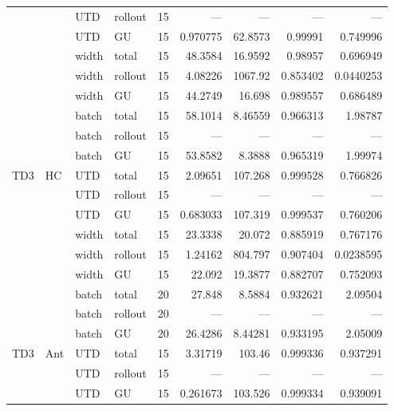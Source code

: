 {\begin{longtable}{@{}llllrrrrr@{}}
     &  & UTD & rollout & \num{15} & --- & --- & --- & --- \\
     &  & UTD & GU & \num{15} & \num{0.970775} & \num{62.8573} & \num{0.99991} & \num{0.749996} \\
     &  & width & total & \num{15} & \num{48.3584} & \num{16.9592} & \num{0.98957} & \num{0.696949} \\
     &  & width & rollout & \num{15} & \num{4.08226} & \num{1067.92} & \num{0.853402} & \num{0.0440253} \\
     &  & width & GU & \num{15} & \num{44.2749} & \num{16.698} & \num{0.989557} & \num{0.686489} \\
     &  & batch & total & \num{15} & \num{58.1014} & \num{8.46559} & \num{0.966313} & \num{1.98787} \\
     &  & batch & rollout & \num{15} & --- & --- & --- & --- \\
     &  & batch & GU & \num{15} & \num{53.8582} & \num{8.3888} & \num{0.965319} & \num{1.99974} \\
    \midrule
    TD3 & HC & UTD & total & \num{15} & \num{2.09651} & \num{107.268} & \num{0.999528} & \num{0.766826} \\
     &  & UTD & rollout & \num{15} & --- & --- & --- & --- \\
     &  & UTD & GU & \num{15} & \num{0.683033} & \num{107.319} & \num{0.999537} & \num{0.760206} \\
     &  & width & total & \num{15} & \num{23.3338} & \num{20.072} & \num{0.885919} & \num{0.767176} \\
     &  & width & rollout & \num{15} & \num{1.24162} & \num{804.797} & \num{0.907404} & \num{0.0238595} \\
     &  & width & GU & \num{15} & \num{22.092} & \num{19.3877} & \num{0.882707} & \num{0.752093} \\
     &  & batch & total & \num{20} & \num{27.848} & \num{8.5884} & \num{0.932621} & \num{2.09504} \\
     &  & batch & rollout & \num{20} & --- & --- & --- & --- \\
     &  & batch & GU & \num{20} & \num{26.4286} & \num{8.44281} & \num{0.933195} & \num{2.05009} \\
    TD3 & Ant & UTD & total & \num{15} & \num{3.31719} & \num{103.46} & \num{0.999336} & \num{0.937291} \\
     &  & UTD & rollout & \num{15} & --- & --- & --- & --- \\
     &  & UTD & GU & \num{15} & \num{0.261673} & \num{103.526} & \num{0.999334} & \num{0.939091} \\

\end{longtable}}
